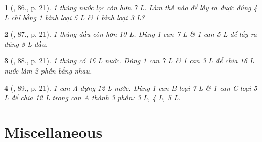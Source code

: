 \documentclass{article}
\newtheorem{baitoan}{}
\begin{document}
\begin{baitoan}[\cite{Tuyen_Toan_6}, 86., p. 21]
	1 thùng nước lọc còn hơn {\rm7 L}. Làm thế nào để lấy ra được đúng {\rm4 L} chỉ bằng 1 bình loại {\rm5 L} \& 1 bình loại {\rm3 L}?
\end{baitoan}

\begin{baitoan}[\cite{Tuyen_Toan_6}, 87., p. 21]
	1 thùng dầu còn hơn {\rm10 L}. Dùng 1 can {\rm7 L} \& 1 can {\rm5 L} để lấy ra đúng {\rm8 L} dầu.
\end{baitoan}

\begin{baitoan}[\cite{Tuyen_Toan_6}, 88., p. 21]
	1 thùng có {\rm16 L} nước. Dùng 1 can {\rm7 L} \& 1 can {\rm3 L} để chia {\rm16 L} nước làm 2 phần bằng nhau.
\end{baitoan}

\begin{baitoan}[\cite{Tuyen_Toan_6}, 89., p. 21]
	1 can A đựng {\rm12 L} nước. Dùng 1 can B loại {\rm7 L} \& 1 can C loại {\rm5 L} để chia {\rm12 L} trong can A thành 3 phần: {\rm3 L, 4 L, 5 L}.
\end{baitoan}


\section{Miscellaneous}


\printbibliography[heading=bibintoc]
\end{document}
